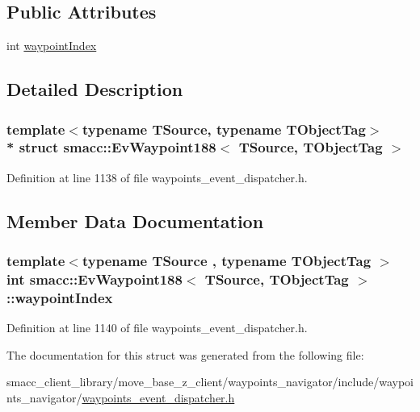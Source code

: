 \subsection*{Public Attributes}
\begin{DoxyCompactItemize}
\item 
int \hyperlink{structsmacc_1_1EvWaypoint188_aa52a9ffa81f53a8a6c25ebb0b3603706}{waypoint\+Index}
\end{DoxyCompactItemize}


\subsection{Detailed Description}
\subsubsection*{template$<$typename T\+Source, typename T\+Object\+Tag$>$\\*
struct smacc\+::\+Ev\+Waypoint188$<$ T\+Source, T\+Object\+Tag $>$}



Definition at line 1138 of file waypoints\+\_\+event\+\_\+dispatcher.\+h.



\subsection{Member Data Documentation}
\subsubsection[{\texorpdfstring{waypoint\+Index}{waypointIndex}}]{\setlength{\rightskip}{0pt plus 5cm}template$<$typename T\+Source , typename T\+Object\+Tag $>$ int {\bf smacc\+::\+Ev\+Waypoint188}$<$ T\+Source, T\+Object\+Tag $>$\+::waypoint\+Index}\hypertarget{structsmacc_1_1EvWaypoint188_aa52a9ffa81f53a8a6c25ebb0b3603706}{}\label{structsmacc_1_1EvWaypoint188_aa52a9ffa81f53a8a6c25ebb0b3603706}


Definition at line 1140 of file waypoints\+\_\+event\+\_\+dispatcher.\+h.



The documentation for this struct was generated from the following file\+:\begin{DoxyCompactItemize}
\item 
smacc\+\_\+client\+\_\+library/move\+\_\+base\+\_\+z\+\_\+client/waypoints\+\_\+navigator/include/waypoints\+\_\+navigator/\hyperlink{waypoints__event__dispatcher_8h}{waypoints\+\_\+event\+\_\+dispatcher.\+h}\end{DoxyCompactItemize}

